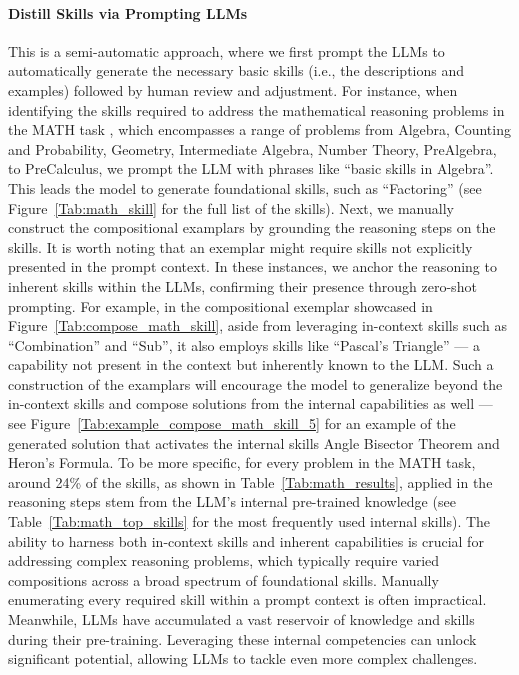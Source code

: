 \documentclass{article} \usepackage{arxiv}
\begin{document}
\paragraph{Distill Skills via Prompting LLMs} 
This is a semi-automatic approach, where we first prompt the LLMs to automatically generate the necessary basic skills (i.e., the descriptions and examples) followed by human review and adjustment. For instance, when identifying the skills required to address the mathematical reasoning problems in the MATH task \citep{hendrycks2021measuring}, which encompasses a range of problems from Algebra, Counting and Probability, Geometry, Intermediate Algebra, Number Theory, PreAlgebra, to PreCalculus, we prompt the LLM with phrases like ``basic skills in Algebra''. This leads the model to generate foundational skills, such as ``Factoring'' (see Figure~\ref{Tab:math_skill} for the full list of the skills). Next, we manually construct the compositional examplars by grounding the reasoning steps on the skills. It is worth noting that an exemplar might require skills not explicitly presented in the prompt context. In these instances, we anchor the reasoning to inherent skills within the LLMs, confirming their presence through zero-shot prompting. For example, in the compositional exemplar showcased in Figure~\ref{Tab:compose_math_skill}, aside from leveraging in-context skills such as ``Combination'' and ``Sub'', it also employs skills like ``Pascal's Triangle'' --- a capability not present in the context but inherently known to the LLM. Such a construction of the examplars will encourage the model to generalize beyond the in-context skills and compose solutions from the internal capabilities as well --- see Figure~\ref{Tab:example_compose_math_skill_5} for an example of the generated solution that activates the internal skills Angle Bisector Theorem and Heron's Formula. To be more specific, for every problem in the MATH task, around 24\% of the skills, as shown in Table~\ref{Tab:math_results}, applied in the reasoning steps stem from the LLM's internal pre-trained knowledge (see Table~\ref{Tab:math_top_skills} for the most frequently used internal skills). The ability to harness both in-context skills and inherent capabilities is crucial for addressing complex reasoning problems, which typically require varied compositions across a broad spectrum of foundational skills. Manually enumerating every required skill within a prompt context is often impractical. Meanwhile, LLMs have accumulated a vast reservoir of knowledge and skills during their pre-training. Leveraging these internal competencies can unlock significant potential, allowing LLMs to tackle even more complex challenges. 
\end{document}
